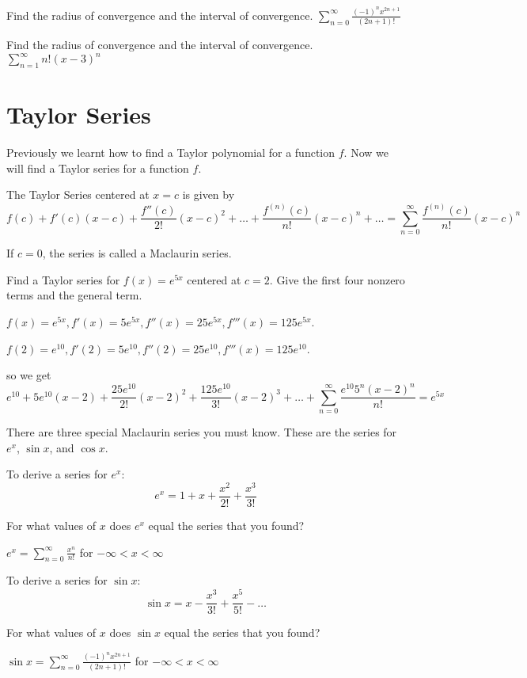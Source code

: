 \documentclass[../bccalc.tex]{subfiles}
\begin{document}
\ex Find the radius of convergence and the interval of convergence. $\sum_{n=0}^{\infty}\frac{(-1)^n x^{2n+1}}{(2n+1)!}$

\ex Find the radius of convergence and the interval of convergence. $\sum_{n=1}^{\infty}n!(x-3)^n$


\section{Taylor Series}
Previously we learnt how to find a Taylor polynomial for a function $f$. Now we will find a Taylor series for a function $f$.

The Taylor Series centered at $x=c$ is given by 
\[ f(c)+f'(c)(x-c)+\frac{f''(c)}{2!}(x-c)^2 + \dots + \frac{f^{(n)}(c)}{n!}(x-c)^n + \dots = \sum_{n=0}^{\infty}\frac{f^{(n)}(c)}{n!}(x-c)^n \]

If $c=0$, the series is called a Maclaurin series.

\begin{example}
    Find a Taylor series for $f(x)=e^{5x}$ centered at $c=2$. Give the first four nonzero terms and the general term.

    $f(x)=e^{5x}, f'(x)=5e^{5x}, f''(x)=25e^{5x}, f'''(x)=125e^{5x}$.

    $f(2)=e^{10}, f'(2)=5e^{10}, f''(2)=25e^{10}, f'''(x)=125e^{10}$.

    so we get 
    \[ e^{10}+5e^{10}(x-2)+\frac{25e^{10}}{2!}(x-2)^2 + \frac{125e^{10}}{3!}(x-2)^3 + \dots + \sum_{n=0}^{\infty}\frac{e^{10}5^n(x-2)^n}{n!}=e^{5x} \]
\end{example}

There are three special Maclaurin series you must know. These are the series for $e^x$, $\sin x$, and $\cos x$.

To derive a series for $e^x$:
\[ e^x=1+x+\frac{x^2}{2!}+\frac{x^3}{3!} \]

For what values of $x$ does $e^x$ equal the series that you found?
\begin{center}
    $e^x = \sum_{n=0}^{\infty} \frac{x^n}{n!}$ for $-\infty<x<\infty$
\end{center}

To derive a series for $\sin x$:
\[ \sin x=x-\frac{x^3}{3!}+\frac{x^5}{5!}-\dots \]

For what values of $x$ does $\sin x$ equal the series that you found?
\begin{center}
    $\sin x = \sum_{n=0}^{\infty}\frac{(-1)^n x^{2n+1}}{(2n+1)!}$ for $-\infty<x<\infty$
\end{center}
\end{document}
